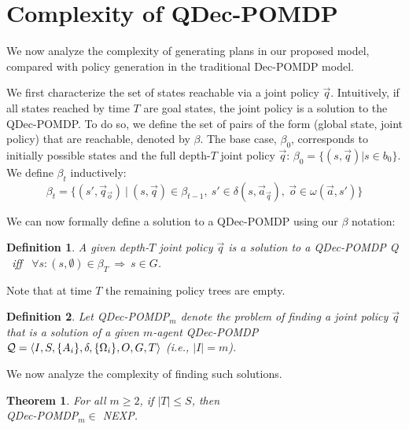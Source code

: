 \documentclass[letterpaper]{article}
\newtheorem{theorem}{Theorem}
\newtheorem{definition}{Definition}
\theoremstyle{definition}
\begin{document}
\section{Complexity of QDec-POMDP}

We now analyze the complexity of generating plans in our proposed model, compared with policy generation in the traditional Dec-POMDP model.

We first characterize the set of states reachable via a joint policy $\vec{q}$. Intuitively, if all states reached by time $T$ are goal states,
the joint policy is a solution to the QDec-POMDP.  To do so, we define the set of pairs of the form (global state, joint policy) that are reachable, denoted by $\beta$.
The base case, $\beta_0$, corresponds to initially possible states and the full depth-$T$ joint policy $\vec{q}$: $\beta_0 = \{(s,\vec{q}) | s \in b_0\}$.  We define $\beta_{t}$ inductively:
\begin{equation} \nonumber
  \beta_{t} = \{ (s', \vec{q}_{\vec{o}}) ~|~
 (s,\vec{q}) \in \beta_{t-1}, ~s' \in \delta(s,\vec{a}_{\vec{q}}), ~\vec{o} \in \omega(\vec{a},s') \}
 \label{eq:bu}
\end{equation}



We can now formally define a solution to a QDec-POMDP using our $\beta$ notation:
\begin{definition}
A given depth-$T$ joint policy $\vec{q}$ is a solution to a QDec-POMDP {\cal Q} ~iff~
$\forall s : (s,\emptyset) \in \beta_T ~\Rightarrow~ s \in G$.
\end{definition}
\noindent Note that at time $T$ the remaining policy trees are empty.

\begin{definition}
Let QDec-POMDP$_m$ denote the problem of finding a joint policy $\vec{q}$ that is a solution of a given $m$-agent
QDec-POMDP ${\cal Q} = \langle  I, S, \{A_i\}, \delta, \{\Omega_i\}, O, G, T\rangle$ (i.e., $|I|=m$).
\end{definition}

We now analyze the complexity of finding such solutions.
\begin{theorem}
For all $m\geq2$, if $|T|\leq S$, then \\ QDec-POMDP$_m \in$ NEXP.
\end{theorem}
\end{document}

